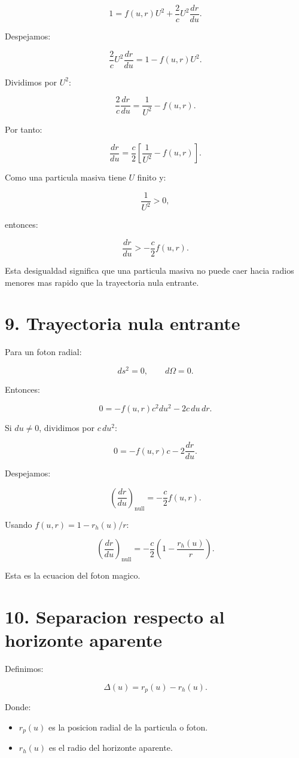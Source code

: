 ﻿\documentclass[11pt,a4paper]{article}
\begin{document}
\[
1
=
f(u,r)U^2
+
\frac{2}{c}U^2\frac{dr}{du}.
\]

Despejamos:

\[
\frac{2}{c}U^2\frac{dr}{du}
=
1-f(u,r)U^2.
\]

Dividimos por \(U^2\):

\[
\frac{2}{c}\frac{dr}{du}
=
\frac{1}{U^2}-f(u,r).
\]

Por tanto:

\[
\frac{dr}{du}
=
\frac{c}{2}
\left[
\frac{1}{U^2}
-
f(u,r)
\right].
\]

Como una particula masiva tiene \(U\) finito y:

\[
\frac{1}{U^2}>0,
\]

entonces:

\[
\frac{dr}{du}
>
-
\frac{c}{2}f(u,r).
\]

Esta desigualdad significa que una particula masiva no puede caer hacia radios menores mas rapido que la trayectoria nula entrante.

\section{9. Trayectoria nula entrante}

Para un foton radial:

\[
ds^2=0,
\qquad
d\Omega=0.
\]

Entonces:

\[
0
=
-
f(u,r)c^2du^2
-2c\,du\,dr.
\]

Si \(du\neq0\), dividimos por \(c\,du^2\):

\[
0
=
-
f(u,r)c
-2\frac{dr}{du}.
\]

Despejamos:

\[
\left(\frac{dr}{du}\right)_{\mathrm{null}}
=
-
\frac{c}{2}f(u,r).
\]

Usando \(f(u,r)=1-r_h(u)/r\):

\[
\left(\frac{dr}{du}\right)_{\mathrm{null}}
=
-
\frac{c}{2}
\left(
1-\frac{r_h(u)}{r}
\right).
\]

Esta es la ecuacion del foton magico.

\section{10. Separacion respecto al horizonte aparente}

Definimos:

\[
\Delta(u)
=
r_p(u)-r_h(u).
\]

Donde:

\begin{itemize}
\item \(r_p(u)\) es la posicion radial de la particula o foton.
\item \(r_h(u)\) es el radio del horizonte aparente.
\end{itemize}
\end{document}
